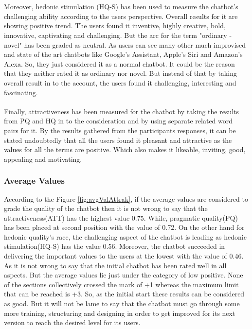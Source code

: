 \\~\\
Moreover, hedonic stimulation (HQ-S) has been used to measure the chatbot's challenging ability according to the users perspective. Overall results for it are showing positive trend. The users found it inventive, highly creative, bold, innovative, captivating and challenging. But the arc for the term "ordinary - novel" has been graded as neutral. As users can see many other much improvised and state of the art chatbots like Google's Assistant, Apple's Siri and Amazon's Alexa. So, they just considered it as a normal chatbot. It could be the reason that they neither rated it as ordinary nor novel. But instead of that by taking overall result in to the account, the users found it challenging, interesting and fascinating.
\\~\\
Finally, attractiveness has been measured for the chatbot by taking the results from PQ and HQ in to the consideration and by using separate related word pairs for it. By the results gathered from the participants responses, it can be stated undoubtedly that all the users found it pleasant and attractive as the values for all the terms are positive. Which also makes it likeable, inviting, good, appealing and motivating.

\subsubsection*{Average Values}
According to the Figure \ref{fig:avgValAttrak}, if the average values are considered to grade the quality of the chatbot then it is not wrong to say that the attractiveness(ATT) has the highest value 0.75. While, pragmatic quality(PQ) has been placed at second position with the value of 0.72. On the other hand for hedonic quality's race, the challenging aspect of the chatbot is leading as hedonic stimulation(HQ-S) has the value 0.56. Moreover, the chatbot succeeded in delivering the important values to the users at the lowest with the value of 0.46. As it is not wrong to say that the initial chatbot has been rated well in all aspects. But the average values lie just under the category of low positive. None of the sections collectively crossed the mark of +1 whereas the maximum limit that can be reached is +3. So, as the initial start these results can be considered as good. But it will not be lame to say that the chatbot must go through some more training, structuring and designing in order to get improved for its next version to reach the desired level for its users.


